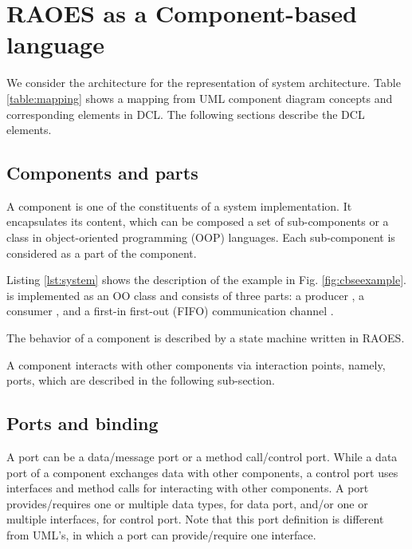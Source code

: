 \section{RAOES as a Component-based language}
We consider the  architecture for the representation of system architecture.
Table \ref{table:mapping} shows a mapping from UML component diagram concepts and corresponding elements in DCL.
The following sections describe the DCL elements.


\subsection{Components and parts}
A component is one of the constituents of a system implementation.
It encapsulates its content, which can be composed a set of sub-components or a class in object-oriented programming (OOP) languages.
Each sub-component is considered as a part of the component.

Listing \ref{lst:system} shows the description of the example in Fig. \ref{fig:cbseexample}.
 is implemented as an OO class and consists of three parts: a producer , a consumer , and a first-in first-out (FIFO) communication channel .


\begin{minipage}{0.95\columnwidth}
	
\end{minipage}

The behavior of a component is described by a state machine written in RAOES. 

A component interacts with other components via interaction points, namely, ports, which are described in the following sub-section.

\subsection{Ports and binding}
A port can be a data/message port or a method call/control port.
While a data port of a component exchanges data with other components,
a control port uses interfaces and method calls for interacting with other components. 
A port provides/requires one or multiple data types, for data port, and/or one or multiple interfaces, for control port.
Note that this port definition is different from UML's, in which a port can provide/require one interface.

